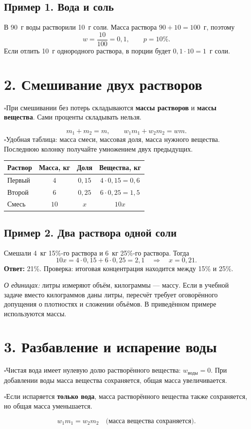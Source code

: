 \documentclass[a4paper,12pt]{article}
\newcommand{\checkitem}[1]{\noindent\(\square\)\enspace #1\par}
\newcommand{\keyterm}[1]{{\color{darkaccent}\textbf{#1}}}
\newcommand{\smallrule}{\par\vspace{.1em}{\color{lightline}\rule{\linewidth}{.35pt}}\vspace{.1em}}
\begin{document}
\subsection*{Пример 1. Вода и соль}
В 90~г воды растворили 10~г соли. Масса раствора \(90+10=100\)~г, поэтому
\[
w=\frac{10}{100}=0{,}1,\qquad p=10\%.
\]
Если отлить 10~г однородного раствора, в порции будет \(0{,}1\cdot10=1\)~г соли.

\smallrule
\section*{2. Смешивание двух растворов}
\checkitem{При смешивании без потерь складываются \keyterm{массы растворов} и \keyterm{массы вещества}. Сами проценты складывать нельзя.}
\[
\boxed{m_1+m_2=m,\qquad w_1m_1+w_2m_2=wm.}
\]
\checkitem{Удобная таблица: масса смеси, массовая доля, масса нужного вещества. Последнюю колонку получайте умножением двух предыдущих.}

\begin{center}
\renewcommand{\arraystretch}{1.26}
\begin{tabularx}{\linewidth}{@{}Xccc@{}}
\toprule
\textbf{Раствор} & \textbf{Масса, кг} & \textbf{Доля} & \textbf{Вещества, кг}\\
\midrule
Первый & \(4\) & \(0{,}15\) & \(4\cdot0{,}15=0{,}6\)\\
Второй & \(6\) & \(0{,}25\) & \(6\cdot0{,}25=1{,}5\)\\
Смесь & \(10\) & \(x\) & \(10x\)\\
\bottomrule
\end{tabularx}
\end{center}
\subsection*{Пример 2. Два раствора одной соли}
Смешали 4~кг 15\%-го раствора и 6~кг 25\%-го раствора. Тогда
\[
10x=4\cdot0{,}15+6\cdot0{,}25=2{,}1
\quad\Longrightarrow\quad x=0{,}21.
\]
\keyterm{Ответ:} 21\%. Проверка: итоговая концентрация находится между 15\% и 25\%.

\textit{О единицах:} литры измеряют объём, килограммы --- массу. Если в учебной задаче вместо килограммов даны литры, пересчёт требует оговорённого допущения о плотностях и сложении объёмов. В приведённом примере используются массы.

\section*{3. Разбавление и испарение воды}
\checkitem{Чистая вода имеет нулевую долю растворённого вещества: \(w_{\text{воды}}=0\). При добавлении воды масса вещества сохраняется, общая масса увеличивается.}
\checkitem{Если испаряется \keyterm{только вода}, масса растворённого вещества также сохраняется, но общая масса уменьшается.}
\[
\boxed{w_1m_1=w_2m_2\quad\text{(масса вещества сохраняется)}.}
\]
\end{document}
